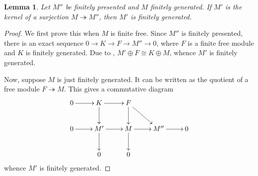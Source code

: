 \documentclass[12pt]{article}
\theoremstyle{thmstyle}
\newtheorem{lemma}[theorem]{Lemma}
\theoremstyle{defstyle}
\newcommand{\onto}{\twoheadrightarrow}
\begin{document}
\begin{lemma}
    Let $M''$ be finitely presented and $M$ finitely generated. If $M'$ is the kernel of a surjection $M\onto M''$, then $M'$ is finitely generated.
\end{lemma}
\begin{proof}
    We first prove this when $M$ is finite free. Since $M''$ is finitely presented, there is an exact sequence $0\to K\to F\to M''\to 0$, where $F$ is a finite free module and $K$ is finitely generated. Due to , $M'\oplus F\cong K\oplus M$, whence $M'$ is finitely generated.

    Now, suppose $M$ is just finitely generated. It can be written as the quotient of a free module $F\onto M$. This gives a commutative diagram 
    \begin{equation*}
        \xymatrix {
            0\ar[r] & K\ar[r]\ar[d] & F\ar[rd]\ar[d] &  &\\
            0\ar[r] & M'\ar[r]\ar[d] & M\ar[r]\ar[d] & M''\ar[r] & 0\\
            & 0 & 0 &  &
        }
    \end{equation*}
    whence $M'$ is finitely generated.
\end{proof}
\end{document}
